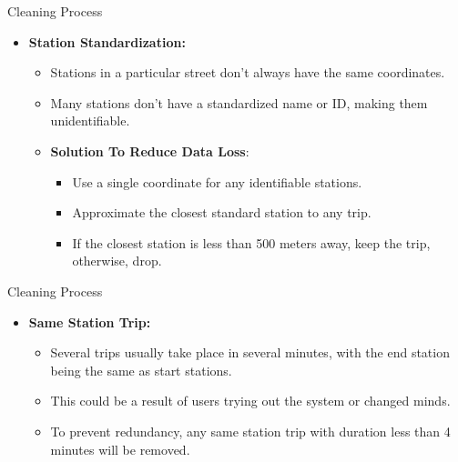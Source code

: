 \documentclass[
  ignorenonframetext,
]{beamer}
\providecommand{\tightlist}{%
  \setlength{\itemsep}{0pt}\setlength{\parskip}{0pt}}
\begin{document}
\begin{frame}{Cleaning Process}
\protect\hypertarget{cleaning-process-1}{}
\begin{itemize}
\item
  \textbf{Station Standardization:}

  \begin{itemize}
  \tightlist
  \item
    Stations in a particular street don't always have the same
    coordinates.
  \item
    Many stations don't have a standardized name or ID, making them
    unidentifiable.
  \item
    \textbf{Solution To Reduce Data Loss}:

    \begin{itemize}
    \tightlist
    \item
      Use a single coordinate for any identifiable stations.
    \item
      Approximate the closest standard station to any trip.
    \item
      If the closest station is less than 500 meters away, keep the
      trip, otherwise, drop.
    \end{itemize}
  \end{itemize}
\end{itemize}
\end{frame}

\begin{frame}{Cleaning Process}
\protect\hypertarget{cleaning-process-2}{}
\begin{itemize}
\tightlist
\item
  \textbf{Same Station Trip:}

  \begin{itemize}
  \tightlist
  \item
    Several trips usually take place in several minutes, with the end
    station being the same as start stations.
  \item
    This could be a result of users trying out the system or changed
    minds.
  \item
    To prevent redundancy, any same station trip with duration less than
    4 minutes will be removed.
  \end{itemize}
\end{itemize}
\end{frame}
\end{document}

